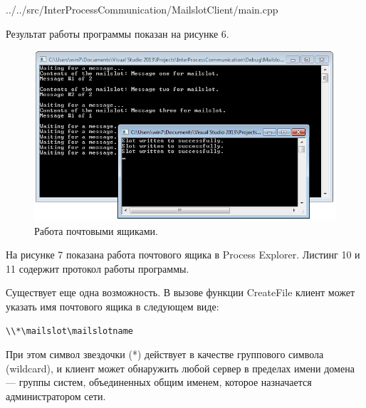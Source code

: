 \documentclass[a4paper, 12pt]{report}		%
\begin{document}
\vspace{3em}


{../../src/InterProcessCommunication/MailslotClient/main.cpp}

Результат работы программы показан на рисунке 6.

\begin{figure}[h!]
\centering
\includegraphics[scale=0.95]{res/06_MailSlot}
\caption{Работа почтовыми ящиками.}
\end{figure}

На рисунке 7 показана работа почтового ящика в Process Explorer. Листинг 10 и 11 содержит протокол работы программы.





Существует еще одна возможность. В вызове функции CreateFile клиент может указать имя почтового ящика в следующем виде:

\begin{verbatim}\\*\mailslot\mailslotname
\end{verbatim}

При этом символ звездочки (*) действует в качестве группового символа (wildcard), и клиент может обнаружить любой сервер в пределах имени домена — группы систем, объединенных общим именем, которое назначается администратором сети. 
\end{document}
